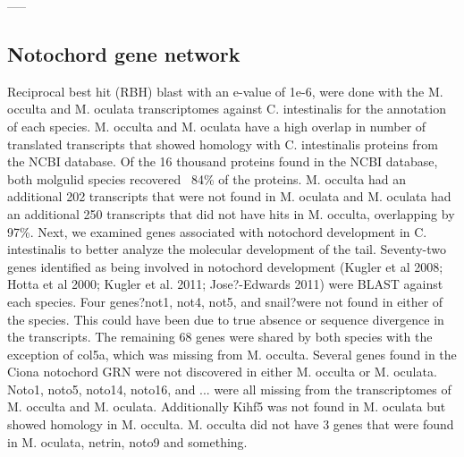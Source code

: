 -----
\subsection{Notochord gene network}

Reciprocal best hit (RBH) blast with an e-value of 1e-6, were done with the M. occulta and M. oculata transcriptomes against C. intestinalis for the annotation of each species. M. occulta and M. oculata have a high overlap in number of translated transcripts that showed homology with C. intestinalis proteins from the NCBI database. Of the 16 thousand proteins found in the NCBI database, both molgulid species recovered  ~84\% of the proteins. M. occulta had an additional 202 transcripts that were not found in M. oculata and M. oculata had an additional 250 transcripts that did not have hits in M. occulta, overlapping by 97\%. Next, we examined genes associated with notochord development in C. intestinalis to better analyze the molecular development of the tail.  Seventy-two genes identified as being involved in notochord development (Kugler et al 2008; Hotta et al 2000; Kugler et al. 2011; Jose?-Edwards 2011) were BLAST against each species. Four genes?not1, not4, not5, and snail?were not found in either of the species. This could have been due to true absence or sequence divergence in the transcripts. The remaining 68 genes were shared by both species with the exception of col5a, which was missing from M. occulta. Several genes found in the Ciona notochord GRN were not discovered in either M. occulta or M. oculata. Noto1, noto5, noto14, noto16, and ... were all missing from the transcriptomes of M. occulta and M. oculata. Additionally Kihf5 was not found in M. oculata but showed homology in M. occulta. M. occulta did not have 3 genes that were found in M. oculata, netrin, noto9 and something. 

